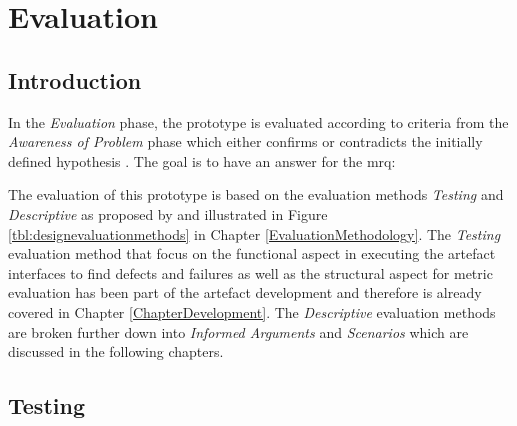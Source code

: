 
\chapter{Evaluation}

\label{ChapterEvaluation}


\section{Introduction}

In the \textit{Evaluation} phase, the prototype is evaluated according to criteria from the \textit{Awareness of Problem} phase which either confirms or contradicts the initially defined hypothesis \citep{Vaishnavi2008}. The goal is to have an answer for the \gls{mrq}:
\begin{framed}
	\textit{\mrqtext}
\end{framed}
The evaluation of this prototype is based on the evaluation methods \textit{Testing} and \textit{Descriptive} as proposed by \cite{Hevner2004} and illustrated in Figure \ref{tbl:designevaluationmethods} in Chapter \ref{EvaluationMethodology}. The \textit{Testing} evaluation method that focus on the functional aspect in executing the artefact interfaces to find defects and failures as well as the structural aspect for metric evaluation has been part of the artefact development and therefore is already covered in Chapter \ref{ChapterDevelopment}. The \textit{Descriptive} evaluation methods are broken further down into \textit{Informed Arguments} and \textit{Scenarios} which are discussed in the following chapters.



\section{Testing}

